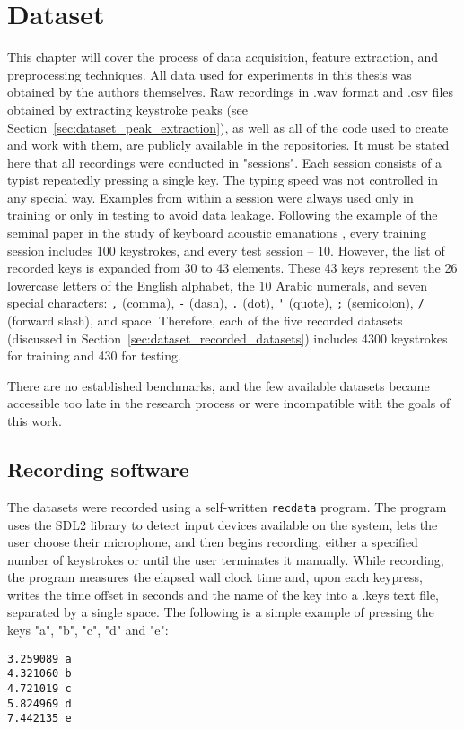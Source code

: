 \documentclass[../main.tex]{subfiles}
\begin{document}
\chapter{Dataset}
\label{cha:dataset}

This chapter will cover the process of data acquisition, feature extraction, and preprocessing techniques.
All data used for experiments in this thesis was obtained by the authors themselves.
Raw recordings in .wav format and .csv files obtained by extracting keystroke peaks (see Section~\ref{sec:dataset_peak_extraction}), as well as all of the code used to create and work with them, are publicly available in the repositories.
It must be stated here that all recordings were conducted in "sessions". Each session consists
of a typist repeatedly pressing a single key. The typing speed was not controlled in any special way.
Examples from within a session were always used only in training or only in testing to avoid data leakage.
Following the example of the seminal paper in the study of keyboard acoustic emanations \cite{og2004},
every training session includes 100 keystrokes, and every test session -- 10.
However, the list of recorded keys is expanded from 30 to 43 elements. These 43 keys represent the 26 lowercase letters
of the English alphabet, the 10 Arabic numerals, and seven special characters: 
\verb|,| (comma), \verb|-| (dash), \verb|.| (dot),  \verb|'| (quote), \verb|;| (semicolon), \verb|/| (forward slash), and space. Therefore, each of the five recorded datasets (discussed in Section~\ref{sec:dataset_recorded_datasets})
includes 4300 keystrokes for training and 430 for testing.

There are no established benchmarks, and the few available datasets became accessible too late in the research process or were incompatible with the goals of this work. 



\section{Recording software}
\label{sec:dataset_recdata}
The datasets were recorded using a self-written \texttt{recdata} program. The program uses the SDL2 library
to detect input devices available on the system, lets the user choose their microphone, and then begins
recording, either a specified number of keystrokes or until the user terminates it manually. While recording,
the program measures the elapsed wall clock time and, upon each keypress, writes the time offset in seconds
and the name of the key into a .keys text file, separated by a single space. The following is a
simple example of pressing the keys "a", "b", "c", "d" and "e":
\begin{verbatim}
3.259089 a
4.321060 b
4.721019 c
5.824969 d
7.442135 e
\end{verbatim}
\end{document}

